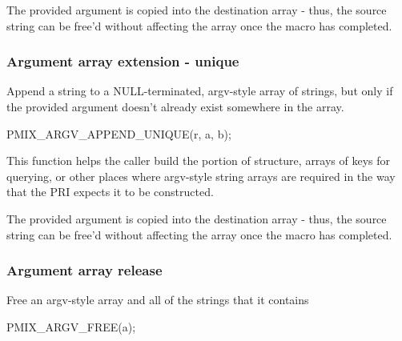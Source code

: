 \adviceuserstart
The provided argument is copied into the destination array - thus, the source string can be free'd without affecting the array once the macro has completed.
\adviceuserend

\subsubsection{Argument array extension - unique}

\summary

Append a string to a NULL-terminated, argv-style array of strings, but only if the provided argument doesn't already exist somewhere in the array.

\cspecificstart
\begin{codepar}
PMIX_ARGV_APPEND_UNIQUE(r, a, b);
\end{codepar}
\cspecificend

\begin{arglist}
\end{arglist}

\descr

This function helps the caller build the  portion of  structure, arrays of keys for querying, or other places where argv-style string arrays are required in the way that the \ac{PRI} expects it to be constructed.

\adviceuserstart
The provided argument is copied into the destination array - thus, the source string can be free'd without affecting the array once the macro has completed.
\adviceuserend

\subsubsection{Argument array release}

\summary

Free an argv-style array and all of the strings that it contains

\cspecificstart
\begin{codepar}
PMIX_ARGV_FREE(a);
\end{codepar}
\cspecificend

\begin{arglist}
\end{arglist}

